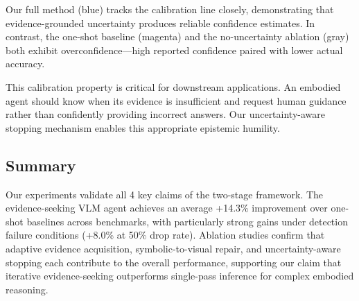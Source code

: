 Our full method (blue) tracks the calibration line closely, demonstrating that evidence-grounded uncertainty produces reliable confidence estimates. In contrast, the one-shot baseline (magenta) and the no-uncertainty ablation (gray) both exhibit overconfidence---high reported confidence paired with lower actual accuracy.

This calibration property is critical for downstream applications. An embodied agent should know when its evidence is insufficient and request human guidance rather than confidently providing incorrect answers. Our uncertainty-aware stopping mechanism enables this appropriate epistemic humility.

\subsection{Summary}

Our experiments validate all 4 key claims of the two-stage framework. The evidence-seeking VLM agent achieves an average +14.3\% improvement over one-shot baselines across benchmarks, with particularly strong gains under detection failure conditions (+8.0\% at 50\% drop rate). Ablation studies confirm that adaptive evidence acquisition, symbolic-to-visual repair, and uncertainty-aware stopping each contribute to the overall performance, supporting our claim that iterative evidence-seeking outperforms single-pass inference for complex embodied reasoning.

